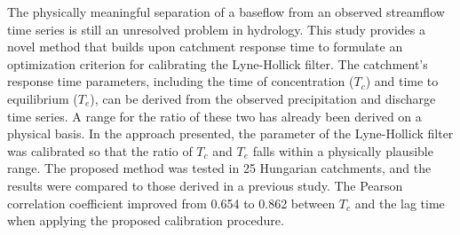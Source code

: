 The physically meaningful separation of a baseflow from an observed streamflow time series is still an unresolved problem in hydrology. This study provides a novel method that builds upon catchment response time to formulate an optimization criterion for calibrating the Lyne-Hollick filter. The catchment’s response time parameters, including the time of concentration ($T_c$) and time to equilibrium ($T_e$), can be derived from the observed precipitation and discharge time series. A range for the ratio of these two has already been derived on a physical basis. In the approach presented, the parameter of the Lyne-Hollick filter was calibrated so that the ratio of $T_c$ and $T_e$ falls within a physically plausible range. The proposed method was tested in 25 Hungarian catchments, and the results were compared to those derived in a previous study. The Pearson correlation coefficient improved from 0.654 to 0.862 between $T_c$ and the lag time when applying the proposed calibration procedure.
\newpage{}
{}
\begin{flushleft}






\end{flushleft}

\noindent

